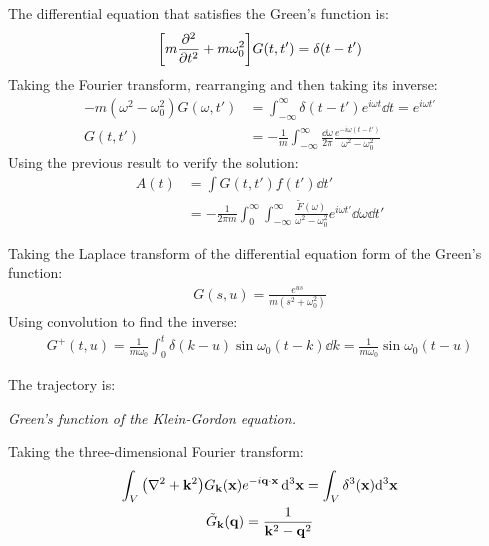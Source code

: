 \documentclass{report}
\begin{document}
\begin{subquests}
\begin{subquests}
		\item The differential equation that satisfies the Green's function is:
		\begin{gather*}
			\bqty{m\pdv[2]{t} + m\omega_0^2}G(t,t') = \delta(t-t')
		\end{gather*}
		Taking the Fourier transform, rearranging and then taking its inverse:
		\begin{align*}
			-m(\omega^2 - \omega_0^2)G(\omega,t') & = \int_{-\infty}^{\infty} \delta(t - t') e^{i\omega t} \dd{t} = e^{i\omega t'} \\
			G(t,t') & = -\frac{1}{m}\int_{-\infty}^{\infty}\frac{\dd{\omega}}{2\pi}\frac{e^{-i\omega(t-t')}}{\omega^2 - \omega_0^2}
		\end{align*}
		Using the previous result to verify the solution:
		\begin{align*}
			A(t) & = \int G(t,t') f(t') \dd{t'} \\
			& = -\frac{1}{2\pi m}\int_0^{\infty}\int_{-\infty}^{\infty}\frac{\tilde F(\omega)}{\omega^2 - \omega_0^2}e^{i\omega t'}\dd{\omega}\dd{t'}
		\end{align*}

		\item Taking the Laplace transform of the differential equation form of the Green's function:
		\begin{gather*}
			G(s,u) = \frac{e^{us}}{m(s^2 + \omega_0^2)}
		\end{gather*}
		Using convolution to find the inverse:
		\begin{gather*}
			G^+(t,u) = \frac{1}{m\omega_0}\int_0^{t} \delta(k-u) \sin \omega_0(t - k) \dd{k}  = \frac{1}{m\omega_0}\sin\omega_0(t-u)
		\end{gather*}

		\item The trajectory is:
	\end{subquests}
	
	\item \emph{Green's function of the Klein-Gordon equation.}
	\begin{subquests}
		\item Taking the three-dimensional Fourier transform:
		\begin{gather*}
			\int_V \pqty{\nabla^2 + \mathbf k^2}G_{\mathbf k}(\mathbf x)e^{-i\vb q\cdot \vb x}\,\dd^3{\vb x} = \int_V \delta^3(\mathbf x) \dd^3{\mathbf x} \\
			\tilde G_{\mathbf k}(\vb q) = \frac{1}{\mathbf k^2 - \vb q^2}
		\end{gather*}
		

\end{subquests}
\end{subquests}
\end{document}
